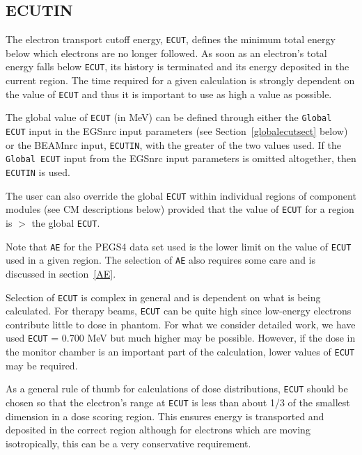 \documentclass[12pt,twoside]{article}
\begin{document}
\subsection{ ECUTIN}
\label{ECUTIN}

The electron transport cutoff energy, {\tt ECUT}, defines the minimum
total energy below which electrons are no longer followed.  As soon
as an electron's total energy falls below {\tt ECUT}, its
history is terminated and its energy deposited in the current region.
The time required for a given calculation is strongly dependent on the
value of \verb+ECUT+ and thus it is important to use as high a value
as possible.

The global value of {\tt ECUT} (in MeV) can be defined through either the
{\tt Global ECUT} input in the EGSnrc input parameters
(see Section~\ref{globalecutsect} below) or the BEAMnrc input, {\tt ECUTIN}, with
the greater of the two values used.  If
the {\tt Global ECUT} input from the EGSnrc input parameters is omitted
altogether, then {\tt ECUTIN} is used.

The user can also override the global {\tt ECUT} within individual regions
of component modules (see CM descriptions below) provided that
the value of \verb+ECUT+ for a region is $>$
the global \verb+ECUT+.

Note that \verb+AE+ for the PEGS4 data set used is the lower limit on the
value of \verb+ECUT+ used in a given region.  The selection of \verb+AE+
also requires some care and is discussed in section~\ref{AE}.  

Selection of \verb+ECUT+ is complex in general and is  dependent on what
is being calculated\cite{Ro84,RB90}.  For therapy beams, \verb+ECUT+
can be quite high since low-energy electrons contribute little to dose
in phantom.  For what we consider detailed work, we have used \verb+ECUT+
= 0.700 MeV but much higher may be possible.  However, if the dose in
the monitor chamber is an important part of the calculation, lower values
of \verb+ECUT+ may be required.


As a general rule of thumb for calculations of dose distributions,
\verb+ECUT+ should be chosen so that the electron's range at \verb+ECUT+
is less than about 1/3 of the smallest dimension in a dose scoring region.
This ensures energy is transported and deposited in the correct region
although for electrons which are moving isotropically, this can be a
very conservative requirement.
\end{document}
